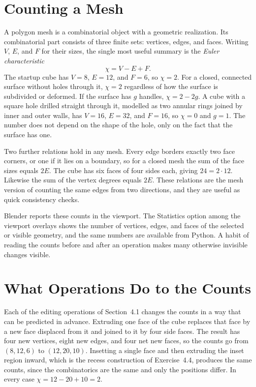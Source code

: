 \section{Counting a Mesh}

A polygon mesh is a combinatorial object with a geometric realization. Its combinatorial part consists of three finite sets: vertices, edges, and faces. Writing $V$, $E$, and $F$ for their sizes, the single most useful summary is the \emph{Euler characteristic}
\[
  \chi=V-E+F.
\]
The startup cube has $V=8$, $E=12$, and $F=6$, so $\chi=2$. For a closed, connected surface without holes through it, $\chi=2$ regardless of how the surface is subdivided or deformed. If the surface has $g$ handles, $\chi=2-2g$. A cube with a square hole drilled straight through it, modelled as two annular rings joined by inner and outer walls, has $V=16$, $E=32$, and $F=16$, so $\chi=0$ and $g=1$. The number does not depend on the shape of the hole, only on the fact that the surface has one.

Two further relations hold in any mesh. Every edge borders exactly two face corners, or one if it lies on a boundary, so for a closed mesh the sum of the face sizes equals $2E$. The cube has six faces of four sides each, giving $24=2\cdot12$. Likewise the sum of the vertex degrees equals $2E$. These relations are the mesh version of counting the same edges from two directions, and they are useful as quick consistency checks.

Blender reports these counts in the viewport. The Statistics option among the viewport overlays shows the number of vertices, edges, and faces of the selected or visible geometry, and the same numbers are available from Python. A habit of reading the counts before and after an operation makes many otherwise invisible changes visible.

\section{What Operations Do to the Counts}

Each of the editing operations of Section~4.1 changes the counts in a way that can be predicted in advance. Extruding one face of the cube replaces that face by a new face displaced from it and joined to it by four side faces. The result has four new vertices, eight new edges, and four net new faces, so the counts go from $(8,12,6)$ to $(12,20,10)$. Insetting a single face and then extruding the inset region inward, which is the recess construction of Exercise~4.4, produces the same counts, since the combinatorics are the same and only the positions differ. In every case $\chi=12-20+10=2$.

